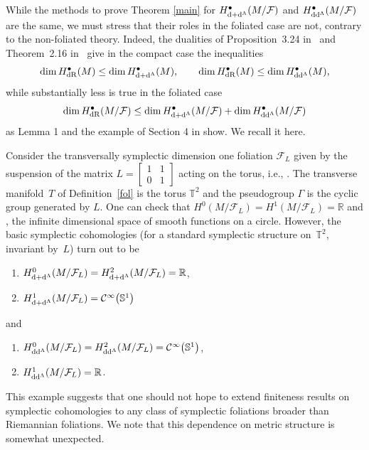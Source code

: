 \documentclass[10pt,a4paper]{amsart}
\numberwithin{equation}{section}
\newcommand{\bigslant}[2]{{\raisebox{.2em}{$#1$}\big/\raisebox{-.2em}{$#2$}}}
\begin{document}
While the methods to prove Theorem \ref{main} for $H^{\bullet}_{{\rm d}+{\rm d}^{\Lambda}}(M\slash\mathcal{F})$ and $H^{\bullet}_{{\rm d}{\rm d}^{\Lambda}}(M\slash\mathcal{F})$ are the same, we must stress that their roles in the foliated case are not, contrary to the non-foliated theory. Indeed, the dualities of Proposition~3.24 in~\cite{tseng} and Theorem~2.16 in~\cite{angela} give in the compact case the inequalities
\begin{gather*}
\dim H^{\bullet}_{{\rm dR}}(M)\leq \dim H^{\bullet}_{{\rm d}+{\rm d}^{\Lambda}}(M),\qquad \dim H^{\bullet}_{{\rm dR}}(M)\leq \dim H^{\bullet}_{{\rm d}{\rm d}^{\Lambda}}(M),
\end{gather*}
while substantially less is true in the foliated case
\begin{gather*}
\dim H^{\bullet}_{{\rm dR}}(M\slash\mathcal{F})\leq \dim H^{\bullet}_{{\rm d}+{\rm d}^{\Lambda}}(M\slash\mathcal{F})+\dim H^{\bullet}_{{\rm d}{\rm d}^{\Lambda}}(M\slash\mathcal{F})
\end{gather*}
as Lemma 1 and the example of Section 4 in \cite{pawelija} show. We recall it here.
\begin{Example}\label{przy}
Consider the transversally symplectic dimension one foliation $\mathcal{F}_L$ given by the suspension of the matrix $L=\left[\begin{smallmatrix}1 & 1\\ 0 & 1\end{smallmatrix}\right]$ acting on the torus, i.e., \smash{$\bigslant{\mathbb{T}^2\times [0,1]}{(t,0)\sim (Lt,1)}=M$}. The transverse manifold~$T$ of Definition~\ref{fol} is the torus $\mathbb{T}^2$ and the pseudogroup $\Gamma$ is the cyclic group generated by $L$. One can check that $H^0(M\slash\mathcal{F}_L)=H^1(M\slash\mathcal{F}_L)=\mathbb{R}$ and , the infinite dimensional space of smooth functions on a circle. However, the basic symplectic cohomologies (for a standard symplectic structure on~$\mathbb{T}^2$, invariant by~$L$) turn out to be
\begin{enumerate}\itemsep=0pt
\item[1)] $H^{0}_{{\rm d}+{\rm d}^{\Lambda}}(M\slash\mathcal{F}_L)=H^{2}_{{\rm d}+{\rm d}^{\Lambda}}(M\slash\mathcal{F}_L)=\mathbb{R}$,
\item[2)] $H^{1}_{{\rm d}+{\rm d}^{\Lambda}}(M\slash\mathcal{F}_L)=\mathcal{C}^{\infty}\big(\mathbb{S}^1\big)$
\end{enumerate}
and
\begin{enumerate}\itemsep=0pt
\item[1)] $H^{0}_{{\rm d}{\rm d}^{\Lambda}}(M\slash\mathcal{F}_L)=H^{2}_{{\rm d}{\rm d}^{\Lambda}}(M\slash\mathcal{F}_L)=\mathcal{C}^{\infty}\big(\mathbb{S}^1\big)$,
\item[2)] $H^{1}_{{\rm d}{\rm d}^{\Lambda}}(M\slash\mathcal{F}_L)=\mathbb{R}$.
\end{enumerate}
This example suggests that one should not hope to extend finiteness results on symplectic cohomologies to any class of symplectic foliations broader than Riemannian foliations. We note that this dependence on metric structure is somewhat unexpected.
\end{Example}
\end{document}
